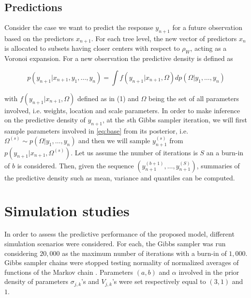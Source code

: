 \subsection{Predictions}\label{ch3:predictions}

Consider the case we want to predict the response $y_{n+1}$ for a future observation based on the predictors $x_{n+1}$. For each tree level, the new vector of predictors $x_n$ is allocated to subsets having closer centers with respect to $\rho_W$, acting as a Voronoi expansion. For a new observation the predictive density is defined as

\begin{equation*}
	p(y_{n+1}|x_{n+1}, y_1, \ldots, y_n) = \int f\left(y_{n+1}|x_{n+1},\Omega\right) dp\left(\Omega|y_1, \ldots, y_n\right) \label{predictive:MSB}
	\end{equation*}

with $f\left(y_{n+1}|x_{n+1},\Omega\right)$ defined as in (1) and $\Omega$ being the set of all parameters involved, i.e. weights, location and scale parameters. In order to make inference on the predictive density of $y_{n+1}$, at the $s$th  Gibbs sampler iteration, we will first sample parameters involved in \ref{eq:base} from its posterior, i.e. $\Omega^{(s)} \sim p\left(\Omega|y_1, \ldots, y_n\right)$ and then we will sample $y^{(s)}_{n+1}$ from $ p\left(y_{n+1}|x_{n+1},\Omega^{(s)}\right)$. Let us assume the number of iterations is $S$ an a burn-in of $b$ is considered. Then, given the sequence $\left(y^{(b+1)}_{n+1}, \ldots, y^{(S)}_{n+1}\right)$, summaries of the predictive density such as mean, variance and quantiles can be computed. 


\section{Simulation studies}\label{sec:sim}

In order to assess the predictive performance of the proposed model, different simulation scenarios were considered. 
 For each, 
the Gibbs sampler was run considering $20,000$ as the maximum number of iterations with a burn-in of $1,000$. Gibbs sampler chains were stopped testing normality of normalized averages of functions of the Markov chain \cite{Chauveau98anautomated}. Parameters $(a,b)$ and $\alpha$ involved in the prior density of parameters $\sigma_{j,k}$'s and $V_{j,k}$'s were set respectively equal to $(3,1)$ and $1$.


